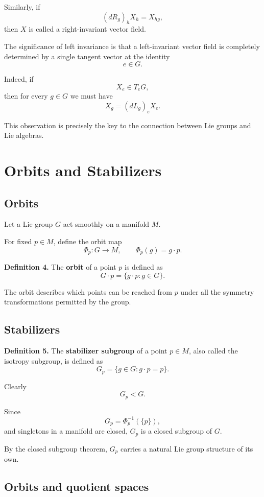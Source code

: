 \documentclass[11pt]{article}
\begin{document}
Similarly, if
\[
(dR_g)_hX_h
=
X_{hg},
\]
then $X$ is called a right-invariant vector field.

The significance of left invariance is that a left-invariant vector field is completely determined by a single tangent vector at the identity
\[
e\in G.
\]

Indeed, if
\[
X_e\in T_eG,
\]
then for every $g\in G$ we must have
\[
X_g
=
(dL_g)_eX_e.
\]

This observation is precisely the key to the connection between Lie groups and Lie algebras.


\section{Orbits and Stabilizers}

\subsection{Orbits}

Let a Lie group $G$ act smoothly on a manifold $M$.

For fixed $p\in M$, define the orbit map
\[
\Phi_p:G\to M,
\qquad
\Phi_p(g)=g\cdot p.
\]

\textbf{Definition 4.}
The \textbf{orbit} of a point $p$ is defined as
\[
G\cdot p
=
\{g\cdot p:g\in G\}.
\]

The orbit describes which points can be reached from $p$ under all the symmetry transformations permitted by the group.


\subsection{Stabilizers}

\textbf{Definition 5.}
The \textbf{stabilizer subgroup} of a point $p\in M$, also called the isotropy subgroup, is defined as
\[
G_p
=
\{g\in G:g\cdot p=p\}.
\]

Clearly
\[
G_p<G.
\]

Since
\[
G_p=\Phi_p^{-1}(\{p\}),
\]
and singletons in a manifold are closed, $G_p$ is a closed subgroup of $G$.

By the closed subgroup theorem, $G_p$ carries a natural Lie group structure of its own.


\subsection{Orbits and quotient spaces}
\end{document}

